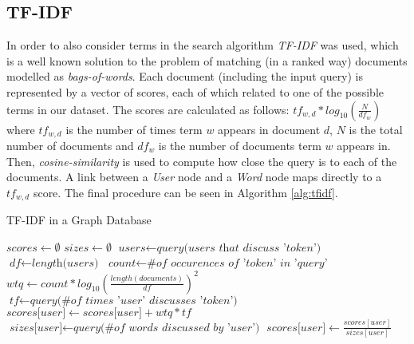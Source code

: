 \subsection{TF-IDF}


In order to also consider terms in the search algorithm \emph{TF-IDF} was used, 
which is a well known solution to the problem of matching (in a ranked
way) documents modelled as \emph{bags-of-words}. Each document (including the
input query) is represented by a vector of scores, each of which related to one
of the possible terms in our dataset. The scores are calculated as follows:
${tf}_{w, d} * log_{10}(\frac{N}{{df}_{w}})$ where ${tf}_{w, d}$ is the number
of times term $w$ appears in document $d$, $N$ is the total number of documents
and ${df}_{w}$ is the number of documents term $w$ appears in. Then,
\emph{cosine-similarity} is used to compute how close the query is to each of
the documents. A link between a \emph{User} node and a \emph{Word} node maps
directly to a ${tf}_{w,d}$ score. The final procedure can be seen in Algorithm \ref{alg:tfidf}.


\begin{algorithm}
\caption{TF-IDF in a Graph Database}\label{alg:tfidf}
\begin{algorithmic}[1]
    \State $\textit{scores} \gets \emptyset$
    \State $\textit{sizes} \gets \emptyset$
        \State $\textit{users} \gets \textit{query(users that discuss 'token')}$
        \State $\textit{df} \gets \textit{length(users)}$
        \State $\textit{count} \gets \textit{\# of occurences of 'token' in 'query'}$
        \State $\textit{wtq} \gets \textit{$count * log_{10}(\frac{length(documents)}{df})^2$}$
        \State $\textit{tf} \gets \textit{query(\# of times 'user' discusses 'token')}$
          \State $\textit{scores[user]} \gets \textit{scores[user]} + wtq*tf$
          \State $\textit{sizes[user]} \gets \textit{query(\# of words discussed by 'user')}$
        \EndFor
    \EndFor
        \State $\textit{scores[user]} \gets \textit{$\frac{scores[user]}{sizes[user]}$}$
    \EndFor
    \State {}
\EndProcedure
\end{algorithmic}
\end{algorithm}
